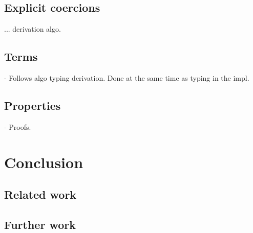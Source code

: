 \documentclass[twocolumn]{article}
\begin{document}
\subsection{Explicit coercions}
... derivation algo.

\subsection{Terms}
- Follows algo typing derivation. Done at the same time as typing in the
impl.

\subsection{Properties}
- Proofs.

\section{Conclusion}
\subsection{Related work}

\subsection{Further work}
\end{document}
